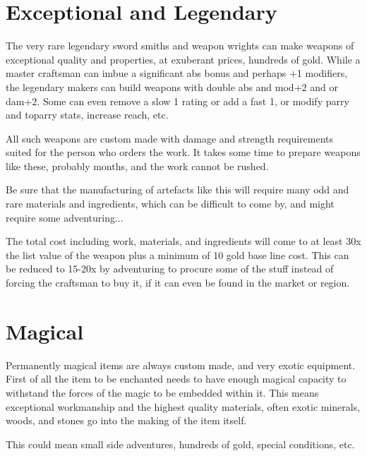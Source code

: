 

\goodbreak
{}
\section*{Exceptional and Legendary}
The very rare legendary sword smiths and weapon wrights can make weapons of exceptional quality and properties, at exuberant prices, hundreds of gold. While a master craftsman can imbue a significant abs bonus and perhaps +1 modifiers, the legendary makers can build weapons with double abs and mod+2 and or dam+2. Some can even remove a slow 1 rating or add a fast 1, or modify parry and toparry stats, increase reach, etc.

All such weapons are custom made with damage and strength requirements suited for the person who orders the work. It takes some time to prepare weapons like these, probably months, and the work cannot be rushed.

Be sure that the manufacturing of artefacts like this will require many odd and rare materials and ingredients, which can be difficult to come by, and might require some adventuring...

The total cost including work, materials, and ingredients will come to at least 30x the list value of the weapon plus a minimum of 10 gold base line cost. This can be reduced to 15-20x by adventuring to procure some of the stuff instead of forcing the craftsman to buy it, if it can even be found in the market or region.


\section*{Magical}
Permanently magical items are always custom made, and very exotic equipment.
First of all the item to be enchanted needs to have enough magical capacity to withstand the forces of the magic to be embedded within it. This means exceptional workmanship and the highest quality materials, often exotic minerals, woods, and stones go into the making of the item itself.

This could mean small side adventures, hundreds of gold, special conditions, etc.


\goodbreak
{}
